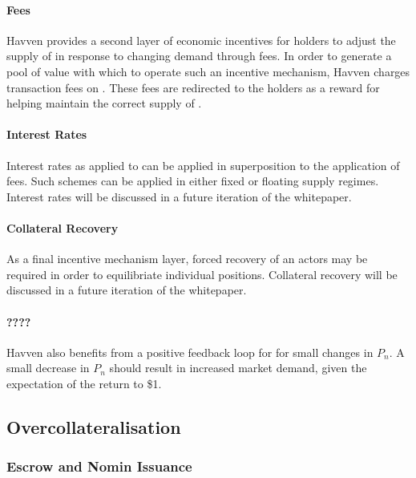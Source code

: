 \paragraph{Fees}

\noindent Havven provides a second layer of economic incentives for \HAV{} holders to adjust the supply of \NOM{} in response to changing demand through fees. In order to generate a pool of value with which to operate such an incentive mechanism, Havven charges transaction fees on \NOM{}. These fees are redirected to the \HAV{} holders as a reward for helping maintain the correct supply of \NOM{}.

\paragraph{Interest Rates}

\noindent Interest rates as applied to \HAV{} can be applied in superposition to the application of fees. Such schemes can be applied in either fixed or floating supply regimes. Interest rates will be discussed in a future iteration of the whitepaper.

\paragraph{Collateral Recovery}

\noindent As a final incentive mechanism layer, forced recovery of an actors \HAV{} may be required in order to equilibriate individual positions. Collateral recovery will be discussed in a future iteration of the whitepaper.

\paragraph{????}

\noindent Havven also benefits from a positive feedback loop for for small changes in $P_n$. A small decrease in $P_n$ should result in increased market demand, given the expectation of the return to \$1. 

\newpage

\subsection{Overcollateralisation}

\subsubsection{Escrow and Nomin Issuance} 

